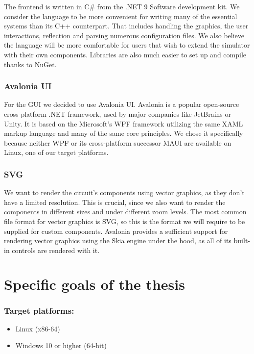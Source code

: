The frontend is written in C\# from the .NET 9 Software development kit. We consider the language to be more convenient for writing many of the essential systems than its C++ counterpart. That includes handling the graphics, the user interactions, reflection and parsing numerous configuration files. We also believe the language will be more comfortable for users that wish to extend the simulator with their own components. Libraries are also much easier to set up and compile thanks to NuGet.

\subsubsection{Avalonia UI}

For the GUI we decided to use Avalonia UI. Avalonia is a popular open-source cross-platform .NET framework, used by major companies like JetBrains or Unity. It is based on the Microsoft's WPF framework utilizing the same XAML markup language and many of the same core principles. We chose it specifically because neither WPF or its cross-platform successor MAUI are available on Linux, one of our target platforms.

\subsubsection{SVG}

We want to render the circuit's components using vector graphics, as they don't have a limited resolution. This is crucial, since we also want to render the components in different sizes and under different zoom levels. The most common file format for vector graphics is SVG, so this is the format we will require to be supplied for custom components. Avalonia provides a sufficient support for rendering vector graphics using the Skia engine under the hood, as all of its built-in controls are rendered with it.

\section{Specific goals of the thesis} \label{sec:goals}

\subsubsection{Target platforms:}
\begin{itemize}
    \item Linux (x86-64)
    \item Windows 10 or higher (64-bit)
\end{itemize}

